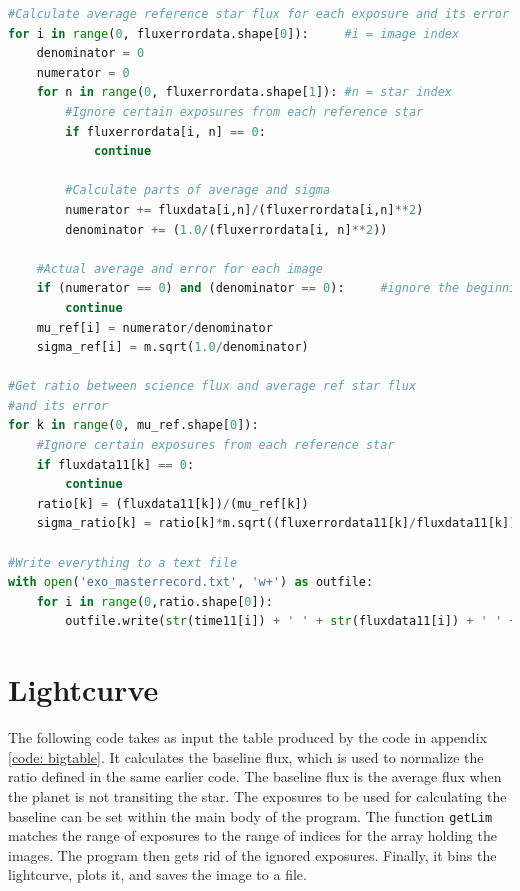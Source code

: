 \documentclass{aastex61}
\begin{document}
\begin{lstlisting}[language = Python, caption = Creates table of values to be used for the final light curve (YM and JM)]
#Calculate average reference star flux for each exposure and its error
for i in range(0, fluxerrordata.shape[0]):     #i = image index
	denominator = 0
	numerator = 0
	for n in range(0, fluxerrordata.shape[1]): #n = star index
		#Ignore certain exposures from each reference star
		if fluxerrordata[i, n] == 0:
			continue
		
		#Calculate parts of average and sigma
		numerator += fluxdata[i,n]/(fluxerrordata[i,n]**2)
		denominator += (1.0/(fluxerrordata[i, n]**2))
	
	#Actual average and error for each image
	if (numerator == 0) and (denominator == 0):     #ignore the beginning exposures
		continue
	mu_ref[i] = numerator/denominator
	sigma_ref[i] = m.sqrt(1.0/denominator)

#Get ratio between science flux and average ref star flux
#and its error
for k in range(0, mu_ref.shape[0]):
	#Ignore certain exposures from each reference star
	if fluxdata11[k] == 0:
		continue
	ratio[k] = (fluxdata11[k])/(mu_ref[k])
	sigma_ratio[k] = ratio[k]*m.sqrt((fluxerrordata11[k]/fluxdata11[k])**2+(sigma_ref[k]/mu_ref[k])**2)

#Write everything to a text file
with open('exo_masterrecord.txt', 'w+') as outfile:
	for i in range(0,ratio.shape[0]):
		outfile.write(str(time11[i]) + ' ' + str(fluxdata11[i]) + ' ' + str(fluxerrordata11[0]) + ' ' + str(mu_ref[i]) + ' ' + str(ratio[i]) + ' ' + str(sigma_ratio[i]) + '\n')
\end{lstlisting}

\section{Lightcurve} \label{code: lightcurve}
The following code takes as input the table produced by the code in appendix \ref{code: bigtable}. It calculates the baseline flux, which is used to normalize the ratio defined in the same earlier code. The baseline flux is the average flux when the planet is not transiting the star. The exposures to be used for calculating the baseline can be set within the main body of the program. The function \verb|getLim| matches the range of exposures to the range of indices for the array holding the images. The program then gets rid of the ignored exposures. Finally, it bins the lightcurve, plots it, and saves the image to a file. 
\end{document}
